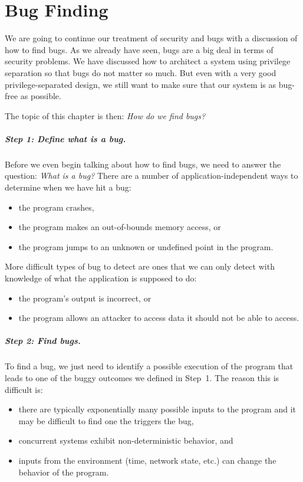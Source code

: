 \chapter{Bug Finding}

We are going to continue our treatment of security and bugs
with a discussion of how to find bugs.
As we already have seen, bugs are a big deal in terms of security
problems.
We have discussed how to architect a system using privilege separation
so that bugs do not matter so much.
But even with a very good privilege-separated design, we still want to 
make sure that our system is as bug-free as possible.

The topic of this chapter is then: \emph{How do we find bugs?}

\paragraph{Step 1: Define what is a bug.}
Before we even begin talking about how to find bugs, we need
to answer the question: \emph{What is a bug?} 
There are a number of application-independent
ways to determine when we have hit a bug:
\begin{itemize}
\item the program crashes,
\item the program makes an out-of-bounds memory access, or
\item the program jumps to an unknown or undefined point in the program.
\end{itemize}
More difficult types of bug to detect are ones that
we can only detect with knowledge of what the application is supposed to do:
\begin{itemize}
\item the program's output is incorrect, or
\item the program allows an attacker to access data it should not be able to access.
\end{itemize}

\paragraph{Step 2: Find bugs.}
To find a bug, we just need to identify a possible
execution of the program that leads to one of the buggy outcomes
we defined in Step~1.
The reason this is difficult is:
\begin{itemize}
\item there are typically exponentially many possible inputs to the program and it may be difficult to find one the triggers the bug,
\item concurrent systems exhibit non-deterministic behavior, and
\item inputs from the environment (time, network state, etc.) can change the behavior of the program.
\end{itemize}


